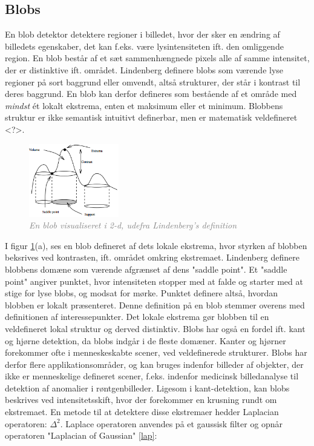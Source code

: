 \subsection{Blobs}
En blob detektor detektere regioner i billedet, hvor der sker en ændring af billedets egenskaber, det kan f.eks. være lysintensiteten ift. den omliggende region. En blob består af et sæt sammenhængnede pixels alle af samme intensitet, der er distinktive ift. området. Lindenberg \cite{blob} definere blobs som værende lyse regioner på sort baggrund eller omvendt, altså strukturer, der står i kontrast til deres baggrund. En blob kan derfor defineres som bestående af et område med \emph{mindst} ét lokalt ekstrema, enten et maksimum eller et minimum. Blobbens struktur er ikke semantisk intuitivt definerbar, men er matematisk veldefineret <?>.
\begin{figure}[H]
    \centering
    \includegraphics[width=0.35\textwidth]{fig/11.png}
    \vspace{-0.5em}   
    \begin{center}
    \caption{\textcolor{gray}{\footnotesize \textit{
    En blob visualiseret i 2-d, udefra Lindenberg's definition \cite{blob}}}}
    \label{fig:lindblob}
     \end{center}
  \end{figure}
       \vspace{-2.7em}
\noindent
I figur \ref{fig:lindblob}(a), ses en blob defineret af dets lokale ekstrema, hvor styrken af blobben beksrives ved kontrasten, ift. området omkring ekstremaet. Lindenberg definere blobbens domæne som værende afgrænset af dens "saddle point". Et "saddle point" angiver punktet, hvor intensiteten stopper med at falde og starter med at stige for lyse blobs, og modsat for mørke. Punktet definere altså, hvordan blobben er lokalt præsenteret. Denne definition på en blob stemmer overens med definitionen af interessepunkter. Det lokale ekstrema gør blobben til en veldefineret lokal struktur og derved distinktiv. Blobs har også en fordel ift. kant og hjørne detektion, da blobs indgår i de fleste domæner. Kanter og hjørner forekommer ofte i menneskeskabte scener, ved veldefinerede strukturer. Blobs har derfor flere applikationsområder, og kan bruges indenfor billeder af objekter, der ikke er menneskelige defineret scener, f.eks. indenfor medicinsk billedanalyse til detektion af anomalier i røntgenbilleder.  Ligesom i kant-detektion, kan blobs beskrives ved intensitetsskift, hvor der forekommer en krusning rundt om ekstremaet. En metode til at detektere disse ekstremaer hedder Laplacian operatoren: $\Delta^2$. Laplace operatoren anvendes på et gaussisk filter og opnår operatoren "Laplacian of Gaussian" \eqref{lap}:
